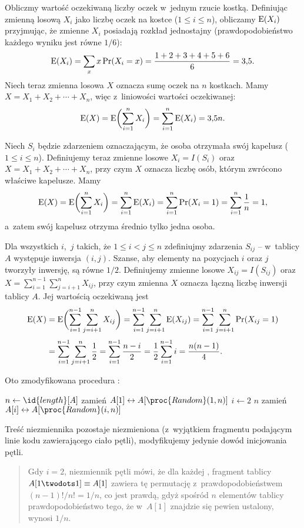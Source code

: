 \exercise %
Obliczmy wartość oczekiwaną liczby oczek w~jednym rzucie kostką. Definiując zmienną losową $X_i$ jako liczbę oczek na  kostce ($1\le i\le n$), obliczamy $\operatorname{E}(X_i)$ przyjmując, że zmienne $X_i$ posiadają rozkład jednostajny (prawdopodobieństwo każdego wyniku jest równe $1/6$):
\[
	\operatorname{E}(X_i) = \sum_xx\Pr(X_i=x) = \frac{1+2+3+4+5+6}{6} = 3{,}5.
\]
Niech teraz zmienna losowa $X$ oznacza sumę oczek na $n$ kostkach. Mamy $X=X_1+X_2+\cdots+X_n$, więc z~liniowości wartości oczekiwanej:
\[
	\operatorname{E}(X) = \operatorname{E}\biggl(\sum_{i=1}^nX_i\biggr) = \sum_{i=1}^n\operatorname{E}(X_i) = 3{,}5n.
\]

\exercise %
Niech $S_i$ będzie zdarzeniem oznaczającym, że  osoba otrzymała swój kapelusz ($1\le i\le n$). Definiujemy teraz zmienne losowe $X_i=I(S_i)$ oraz $X=X_1+X_2+\cdots+X_n$, przy czym $X$ oznacza liczbę osób, którym zwrócono właściwe kapelusze. Mamy
\[
	\operatorname{E}(X) = \operatorname{E}\biggl(\sum_{i=1}^nX_i\biggr) = \sum_{i=1}^n\operatorname{E}(X_i) = \sum_{i=1}^n\Pr(X_i=1) = \sum_{i=1}^n\frac{1}{n} = 1,
\]
a~zatem swój kapelusz otrzyma średnio tylko jedna osoba.

\exercise %
Dla wszystkich $i$,~$j$ takich, że $1\le i<j\le n$ zdefiniujmy zdarzenia $S_{ij}$ -- w~tablicy $A$ występuje inwersja $(i,j)$. Szanse, aby elementy na pozycjach $i$ oraz $j$ tworzyły inwersję, są równe $1/2$. Definiujemy zmienne losowe $X_{ij}=I(S_{ij})$ oraz $X=\sum_{i=1}^{n-1}\sum_{j=i+1}^nX_{ij}$, przy czym zmienna $X$ oznacza łączną liczbę inwersji tablicy $A$. Jej wartością oczekiwaną jest
\begin{align*}
	\operatorname{E}(X) &= \operatorname{E}\biggl(\sum_{i=1}^{n-1}\sum_{j=i+1}^nX_{ij}\biggr) = \sum_{i=1}^{n-1}\sum_{j=i+1}^n\operatorname{E}(X_{ij}) = \sum_{i=1}^{n-1}\sum_{j=i+1}^n\Pr(X_{ij}=1) \\[1mm]
	&= \sum_{i=1}^{n-1}\sum_{j=i+1}^n\frac{1}{2} = \sum_{i=1}^{n-1}\frac{n-i}{2} = \frac{1}{2}\sum_{i=1}^{n-1}i = \frac{n(n-1)}{4}.
\end{align*}


\exercise %
Oto zmodyfikowana procedura :
\begin{codebox}
\li	$n\gets\id{length}[A]$
\li	zamień $A[1]\leftrightarrow A[\proc{Random}(1,n)]$
\li	\For $i\gets2$ \To $n$
\li		\Do
			zamień $A[i]\leftrightarrow A[\proc{Random}(i,n)]$
		\End
\end{codebox}
Treść niezmiennika pozostaje niezmieniona (z~wyjątkiem fragmentu podającym linie kodu zawierającego ciało pętli), modyfikujemy jedynie dowód inicjowania pętli.
\begin{quote}
	Gdy $i=2$, niezmiennik pętli mówi, że dla każdej , fragment tablicy $A[1\twodots1]\equiv A[1]$ zawiera tę permutację z~prawdopodobieństwem $(n-1)!/n!=1/n$, co jest prawdą, gdyż spośród $n$ elementów tablicy prawdopodobieństwo tego, że w~$A[1]$ znajdzie się pewien ustalony, wynosi $1/n$.
\end{quote}

